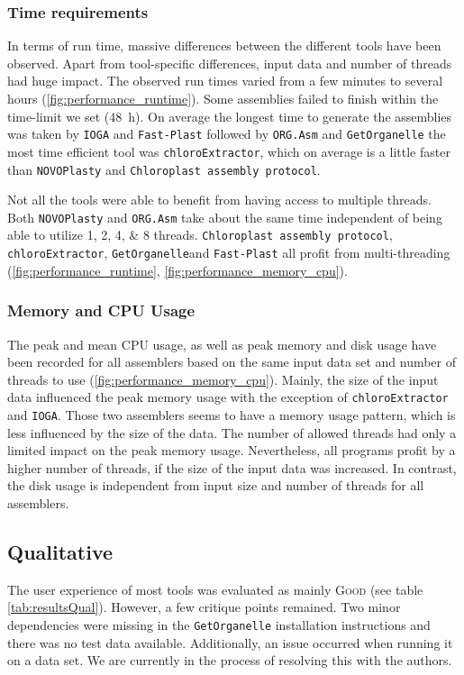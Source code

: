 \documentclass{bmcart}
\newcounter{todocounter}
\newcommand{\ak}[1]
{\stepcounter{todocounter}
 \todo[color=green!40,author=Arthur]{\thetodocounter: #1}
 }
\newcommand{\formatprogramnames}[1]{\texttt{#1}}
\newcommand{\ce}{\formatprogramnames{chloroExtractor}}
\newcommand{\oa}{\formatprogramnames{ORG.Asm}}
\newcommand{\fp}{\formatprogramnames{Fast-Plast}}
\newcommand{\ioga}{\formatprogramnames{IOGA}}
\newcommand{\np}{\formatprogramnames{NOVOPlasty}}
\newcommand{\go}{\formatprogramnames{GetOrganelle}}
\newcommand{\cassp}{\formatprogramnames{Chloroplast assembly protocol}}
\newcommand{\good}{\textsc{Good}}
\begin{document}
\subsubsection*{Time requirements}
In terms of run time, massive differences between the different tools have been observed. Apart from tool-specific differences, input data and number of threads had huge impact. The observed run times varied from a few minutes to several hours (\cref{fig:performance_runtime}).
Some assemblies failed to finish within the time-limit we set (\SI{48}{\hour}). 
On average the longest time to generate the assemblies was taken by \ioga{} and \fp{} followed by \oa{} and \go{} the most time efficient tool was \ce{}, which on average is a little faster than \np{} and \cassp{}.

Not all the tools were able to benefit from having access to multiple threads. Both \np{} and \oa{} take about the same time independent of being able to utilize \numlist[list-final-separator={, or }]{1;2;4;8} threads. \cassp{}, \ce{}, \go  and \fp{} all profit from multi-threading (\cref{fig:performance_runtime}, \cref{fig:performance_memory_cpu}).

\subsubsection*{Memory and CPU Usage }
The peak and mean CPU usage, as well as peak memory and disk usage have been recorded for all assemblers based on the same input data set and number of threads to use (\cref{fig:performance_memory_cpu}).
Mainly, the size of the input data influenced the peak memory usage with the exception of \ce{} and \ioga{}.
Those two assemblers seems to have a memory usage pattern, which is less influenced by the size of the data.
The number of allowed threads had only a limited impact on the peak memory usage.
Nevertheless, all programs profit by a higher number of threads, if the size of the input data was increased.
In contrast, the disk usage is independent from input size and number of threads for all assemblers.

\subsection*{Qualitative}
The user experience of most tools was evaluated as mainly \good{} (see table \ref{tab:resultsQual}). However, a few critique points remained.
Two minor dependencies were missing in the \go{} installation instructions and there was no test data available.
Additionally, an issue occurred when running it on a  data set.
We are currently in the process of resolving this with the authors.
\end{document}
